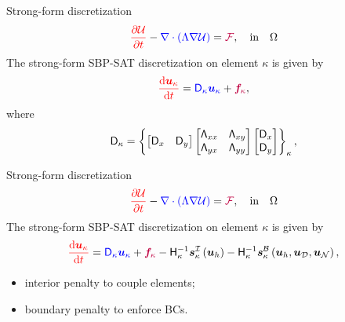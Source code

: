 \documentclass{beamer}
\begin{document}
\begin{frame}{Strong-form discretization}
    \begin{equation*}
    {\color{red}\frac{\partial \ensuremath{\mathcal{U}}}{\partial{t}}}- {\color{blue}\nabla\cdot\left( \Lambda \nabla \mathcal{U} \right)} = {\color{purple}\mathcal{F}},\quad \text{in} \quad\Omega
    \end{equation*}
    \vskip 5mm
The strong-form SBP-SAT discretization on element $\kappa$ is given by
\begin{equation*}
{\color{red}\frac{\mathrm{d}\bm{u}_{\kappa}}{\mathrm{d}t}} = {\color{blue}\mathsf{D}_\kappa\bm{u}_{\kappa}} + {\color{purple}\bm{f}_\kappa },
\end{equation*}
where 
\begin{equation*}
\mathsf{D}_\kappa = \left\{ \begin{bmatrix} \mathsf{D}_{x} & \mathsf{D}_{y} \end{bmatrix}
\begin{bmatrix} \mathsf{\Lambda}_{xx} & \mathsf{\Lambda}_{xy} \\ \mathsf{\Lambda}_{yx} & \mathsf{\Lambda}_{yy} \end{bmatrix}
\begin{bmatrix} \mathsf{D}_{x} \\ \mathsf{D}_{y} \end{bmatrix} \right\}_{\kappa},
\end{equation*}
\end{frame}

\begin{frame}{Strong-form discretization}
    \begin{equation*}
    {\color{red}\frac{\partial \ensuremath{\mathcal{U}}}{\partial{t}}}- {\color{blue}\nabla\cdot\left( \Lambda \nabla \mathcal{U} \right)} = {\color{purple}\mathcal{F}},\quad \text{in} \quad\Omega
    \end{equation*}
    \vskip 5mm
    The strong-form SBP-SAT discretization on element $\kappa$ is given by
    \begin{equation*}
    {\color{red}\frac{\mathrm{d}\bm{u}_{\kappa}}{\mathrm{d}t}} = {\color{blue}\mathsf{D}_\kappa\bm{u}_{\kappa}} + {\color{purple}\bm{f}_\kappa }
    -\mathsf{H}_{\kappa}^{-1}\bm{s}_{\kappa}^{\mathcal{I}}\left(\bm{u}_{h}\right) 
    -\mathsf{H}_{\kappa}^{-1}\bm{s}_{\kappa}^{\mathcal{B}}\left(\bm{u}_{h}, \bm{u}_{\mathcal{D}}, \bm{u}_{\mathcal{N}}\right),
    \end{equation*}
    
    \begin{itemize}
        \item interior penalty to couple elements;
        \item boundary penalty to enforce BCs.
    \end{itemize}
\end{frame}
\end{document}
